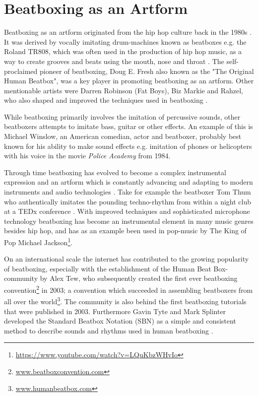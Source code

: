 \section{Beatboxing as an Artform}
Beatboxing as an artform originated from the hip hop culture back in the 1980s  \citep{Stowell2010}. It was derived by vocally imitating drum-machines known as beatboxes e.g. the Roland TR808, which was often used in the production of hip hop music, as a way to create grooves and beats using the mouth, nose and throat \citep{proctor2012}. The self-proclaimed pioneer of beatboxing, Doug E. Fresh also known as the "The Original Human Beatbox", was a key player in promoting beatboxing as an artform. Other mentionable artists were Darren Robinson (Fat Boys), Biz Markie and Rahzel, who also shaped and improved the techniques used in beatboxing \citep{Hess2007}.

While beatboxing primarily involves the imitation of percussive sounds, other beatboxers attempts to imitate bass, guitar or other effects. An example of this is Michael Winslow, an American comedian, actor and beatboxer, probably best known for his ability to make sound effects e.g. imitation of phones or helicopters with his voice in the movie \textit{Police Academy} from 1984. 

Through time beatboxing has evolved to become a complex instrumental expression and an artform which is constantly advancing and adapting to modern instruments and audio technologies \citep{proctor2012}. Take for example the beatboxer Tom Thum who authentically imitates the pounding techno-rhythm from within a night club at a TEDx conference \citep{TEDx}. With improved techniques and sophisticated microphone technology beatboxing has become an instrumental element in many music genres besides hip hop, and has as an example been used in pop-music by The King of Pop Michael Jackson\footnote{\url{https://www.youtube.com/watch?v=LQuKbzWHvIo}}.

On an international scale the internet has contributed to the growing popularity of beatboxing, especially with the establishment of the Human Beat Box-community by Alex Tew, who subsequently created the first ever beatboxing convention\footnote{\url{www.beatboxconvention.com}} in 2003; a convention which succeeded in assembling beatboxers from all over the world\footnote{\url{www.humanbeatbox.com}}.
The community is also behind the first beatboxing tutorials that were published in 2003. Furthermore Gavin Tyte and Mark Splinter developed the Standard Beatbox Notation (SBN) as a simple and consistent method to describe sounds and rhythms used in human beatboxing \citep{Tyte}.